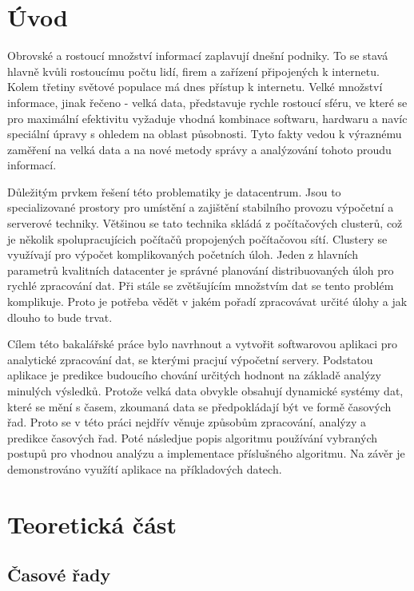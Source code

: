 \documentclass[a4paper,12pt,twoside]{scrreprt}
\begin{document}
\chapter*{Úvod}

Obrovské a rostoucí množství informací zaplavují dnešní podniky. To se stavá hlavně kvůli rostoucímu počtu lidí, firem a zařízení připojených k internetu. Kolem třetiny světové populace má dnes přístup k internetu. Velké množství informace, jinak řečeno - velká data, představuje rychle rostoucí sféru, ve které se pro maximální efektivitu vyžaduje vhodná kombinace softwaru, hardwaru a navíc speciální úpravy s ohledem na oblast působnosti. Tyto fakty vedou k výraznému zaměření na velká data a na nové metody správy a analýzování tohoto proudu informací. 

Důležitým prvkem řešení této problematiky je datacentrum. Jsou to specializované prostory pro umístění a zajištění stabilního provozu výpočetní a serverové techniky. Většinou se tato technika skládá z počítačových clusterů, což je několik spolupracujícich počítačů propojených počítačovou sítí. Clustery se využívají pro výpočet komplikovaných početních úloh. Jeden z hlavních parametrů kvalitních datacenter je správné planování distribuovaných úloh pro rychlé zpracování dat. Při stále se zvětšujícím množstvím dat se tento problém komplikuje. Proto je potřeba vědět v jakém pořadí zpracovávat určité úlohy a jak dlouho to bude trvat. 

Cílem této bakalářské práce bylo navrhnout a vytvořit softwarovou aplikaci pro analytické zpracování dat, se kterými pracjuí výpočetní servery. Podstatou aplikace je predikce budoucího chování určitých hodnont na základě analýzy minulých výsledků. Protože velká data obvykle obsahují dynamické systémy dat, které se mění s časem, zkoumaná data se předpokládají být ve formě časových řad. Proto se v této práci nejdřív věnuje způsobům zpracování, analýzy a predikce časových řad. Poté následjue popis algoritmu používání vybraných postupů pro vhodnou analýzu a implementace příslušného algoritmu. Na závěr je demonstrováno využítí aplikace na příkladových datech. 


\chapter{Teoretická část}

\section{Časové řady}
\end{document}
